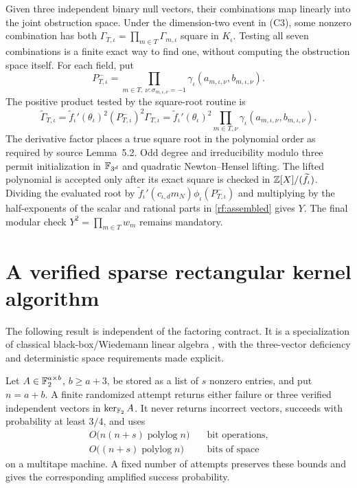 Given three independent binary null vectors, their combinations
map linearly into the joint obstruction space.  Under the
dimension-two event in \textup{(C3)}, some nonzero combination has
both $\Gamma_{T,\iota}=\prod_{m\in T}\Gamma_{m,\iota}$ square in
$K_\iota$.  Testing all seven combinations is a finite exact way
to find one, without computing the obstruction space itself.
For each field, put
\[
 P^-_{T,\iota}=\prod_{m\in T,\ \nu:\sigma_{m,\iota,\nu}=-1}
                         \gamma_\iota(a_{m,\iota,\nu},b_{m,\iota,\nu}).
\]
The positive product tested by the square-root routine is
\[
 \widetilde\Gamma_{T,\iota}
  =\widetilde f_\iota'(\theta_\iota)^2
      (P^-_{T,\iota})^2\Gamma_{T,\iota}
  =\widetilde f_\iota'(\theta_\iota)^2
       \prod_{m\in T,\nu}\gamma_\iota(a_{m,\iota,\nu},b_{m,\iota,\nu}).
\]
The derivative factor places a true square root in the polynomial
order as required by source Lemma~5.2.  Odd degree and irreducibility
modulo three permit initialization in $\mathbb F_{3^d}$ and quadratic
Newton--Hensel lifting.  The lifted polynomial is accepted only
after its exact square is checked in $\mathbb Z[X]/(\widetilde f_\iota)$.
Dividing the evaluated root by
$\widetilde f_\iota'(c_{\iota,d}m_N)\phi_\iota(P^-_{T,\iota})$
and multiplying by the half-exponents of the scalar and rational
parts in \eqref{rf:assembled} gives $Y$.
The final modular check $Y^2=\prod_{m\in T}w_m$ remains mandatory.

\section{A verified sparse rectangular kernel algorithm}
\label{rf:sparse}

The following result is independent of the factoring contract.
It is a specialization of classical black-box/Wiedemann linear
algebra \cite{Wiedemann1986}, with the three-vector deficiency and
deterministic space requirements made explicit.

\begin{theorem}
\label{rf:kerneltheorem}
Let $A\in\mathbb F_2^{a\times b}$, $b\ge a+3$, be stored as a list of
$s$ nonzero entries, and put $n=a+b$.  A finite randomized attempt
returns either failure or three verified independent vectors in
$\ker_{\mathbb F_2}A$.  It never returns incorrect vectors, succeeds
with probability at least $3/4$, and uses
\begin{align*}
 O\bigl(n(n+s)\operatorname{polylog}n\bigr)
 &\quad\text{bit operations},\\
 O\bigl((n+s)\operatorname{polylog}n\bigr)
 &\quad\text{bits of space}
\end{align*}
on a multitape machine.  A fixed number of attempts preserves
these bounds and gives the corresponding amplified success
probability.
\end{theorem}

